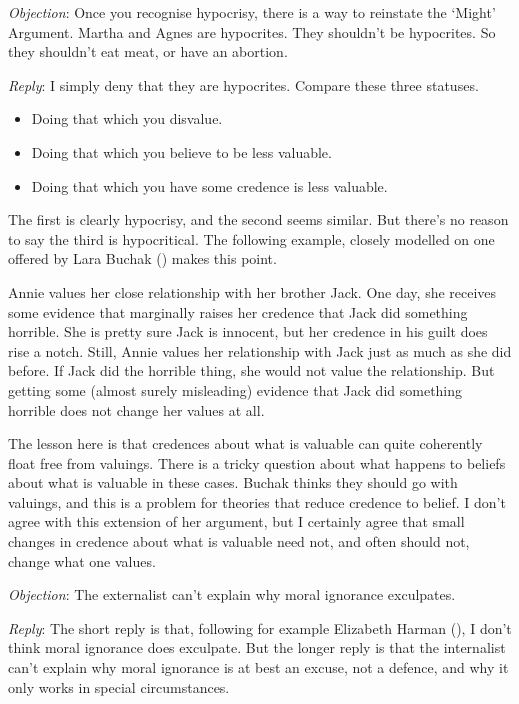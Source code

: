 \documentclass[
  11pt,
  letterpaper,
  DIV=11,
  numbers=noendperiod,
  twoside]{scrartcl}
\providecommand{\tightlist}{%
  \setlength{\itemsep}{0pt}\setlength{\parskip}{0pt}}
\begin{document}
\emph{Objection}: Once you recognise hypocrisy, there is a way to
reinstate the `Might' Argument. Martha and Agnes are hypocrites. They
shouldn't be hypocrites. So they shouldn't eat meat, or have an
abortion.

\emph{Reply}: I simply deny that they are hypocrites. Compare these
three statuses.

\begin{itemize}
\tightlist
\item
  Doing that which you disvalue.
\item
  Doing that which you believe to be less valuable.
\item
  Doing that which you have some credence is less valuable.
\end{itemize}

The first is clearly hypocrisy, and the second seems similar. But
there's no reason to say the third is hypocritical. The following
example, closely modelled on one offered by Lara Buchak
() makes this point.

Annie values her close relationship with her brother Jack. One day, she
receives some evidence that marginally raises her credence that Jack did
something horrible. She is pretty sure Jack is innocent, but her
credence in his guilt does rise a notch. Still, Annie values her
relationship with Jack just as much as she did before. If Jack did the
horrible thing, she would not value the relationship. But getting some
(almost surely misleading) evidence that Jack did something horrible
does not change her values at all.

The lesson here is that credences about what is valuable can quite
coherently float free from valuings. There is a tricky question about
what happens to beliefs about what is valuable in these cases. Buchak
thinks they should go with valuings, and this is a problem for theories
that reduce credence to belief. I don't agree with this extension of her
argument, but I certainly agree that small changes in credence about
what is valuable need not, and often should not, change what one values.

\emph{Objection}: The externalist can't explain why moral ignorance
exculpates.

\emph{Reply}: The short reply is that, following for example Elizabeth
Harman (), I don't think moral ignorance
does exculpate. But the longer reply is that the internalist can't
explain why moral ignorance is at best an excuse, not a defence, and why
it only works in special circumstances.
\end{document}
